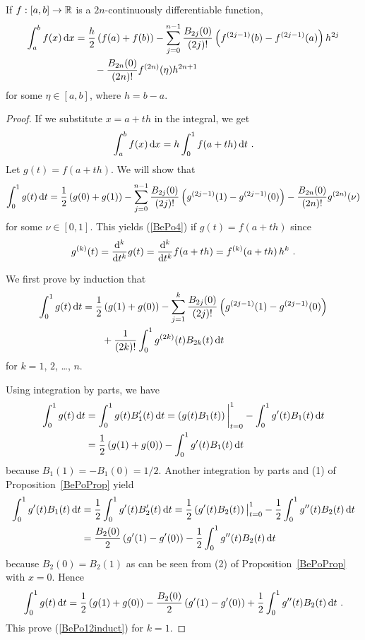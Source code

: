 \begin{theorem}
If $f:[a,b]\rightarrow \RR$ is a $2n$-continuously differentiable
function,
\begin{equation} \label{BePo4}
\begin{split}
\int_a^b f(x)\dx{x} &= \frac{h}{2}\left(f(a)+f(b)\right)
- \sum_{j=0}^{n-1} \frac{B_{2j}(0)}{(2j)!}
\left(f^{(2j-1)}(b) - f^{(2j-1)}(a)\right)h^{2j} \\
&\qquad - \frac{B_{2n}(0)}{(2n)!} f^{(2n)}(\eta)h^{2n+1}
\end{split}
\end{equation}
for some $\eta \in [a,b]$, where $h=b-a$.
\label{RombBerTrap}
\end{theorem}

\begin{proof}
If we substitute $x=a + t h$ in the integral, we get
\[
\int_a^b f(x)\dx{x} = h \int_0^1 f(a+th)\dx{t} \ .
\]
Let $g(t) = f(a+th)$.  We will show that
\begin{equation}\label{BePo11}
\int_0^1 g(t)\dx{t} = \frac{1}{2}\left(g(0)+g(1)\right)
- \sum_{j=0}^{n-1} \frac{B_{2j}(0)}{(2j)!}
\left(g^{(2j-1)}(1) - g^{(2j-1)}(0)\right)
- \frac{B_{2n}(0)}{(2n)!} g^{(2n)}(\nu)
\end{equation}
for some $\nu \in [0,1]$.  This yields (\ref{BePo4}) if
$g(t) = f(a+th)$ since
\[
g^{(k)}(t) = \dfdxn{g}{t}{k}(t) = \dfdxn{f(a+th)}{t}{k}  = 
f^{(k)}(a+th)\, h^k \ .
\]

We first prove by induction that
\begin{equation}\label{BePo12induct}
\begin{split}
\int_0^1 g(t)\dx{t} &= \frac{1}{2} \left(g(1)+g(0)\right)
- \sum_{j=1}^k \frac{B_{2j}(0)}{(2j)!}
\left(g^{(2j-1)}(1)-g^{(2j-1)}(0)\right) \\
& \qquad + \frac{1}{(2k)!} \int_0^1 g^{(2k)}(t) B_{2k}(t) \dx{t}
\end{split}
\end{equation}
for $k=1$, $2$, \ldots, $n$.

Using integration by parts, we have
\begin{align*}
\int_0^1 g(t)\dx{t} &= \int_0^1 g(t) B_1'(t) \dx{t}
= \left(g(t)B_1(t)\right)\bigg|_{t=0}^1 -
\int_0^1 g'(t) B_1(t) \dx{t} \\
&= \frac{1}{2} \left(g(1)+g(0)\right) -\int_0^1 g'(t) B_1(t) \dx{t}
\end{align*}
because $B_1(1) = -B_1(0) = 1/2$.  Another integration by parts and (1)
of Proposition~\ref{BePoProp} yield
\begin{align*}
\int_0^1 g'(t) B_1(t) \dx{t}
&= \frac{1}{2} \int_0^1 g'(t) B_2'(t) \dx{t}
= \frac{1}{2} \left(g'(t)B_2(t)\right)\big|_{t=0}^1 -
\frac{1}{2} \int_0^1 g''(t) B_2(t) \dx{t} \\
&= \frac{B_2(0)}{2} \left(g'(1)-g'(0)\right)
- \frac{1}{2}\int_0^1 g''(t) B_2(t) \dx{t}
\end{align*}
because $B_2(0)=B_2(1)$ as can be seen from (2) of
Proposition~\ref{BePoProp} with $x=0$.  Hence
\[
\int_0^1 g(t)\dx{t} = \frac{1}{2} \left(g(1)+g(0)\right)
- \frac{B_2(0)}{2} \left(g'(1)-g'(0)\right)
+ \frac{1}{2} \int_0^1 g''(t) B_2(t) \dx{t} \ .
\]
This prove (\ref{BePo12induct}) for $k=1$.


\end{proof}
